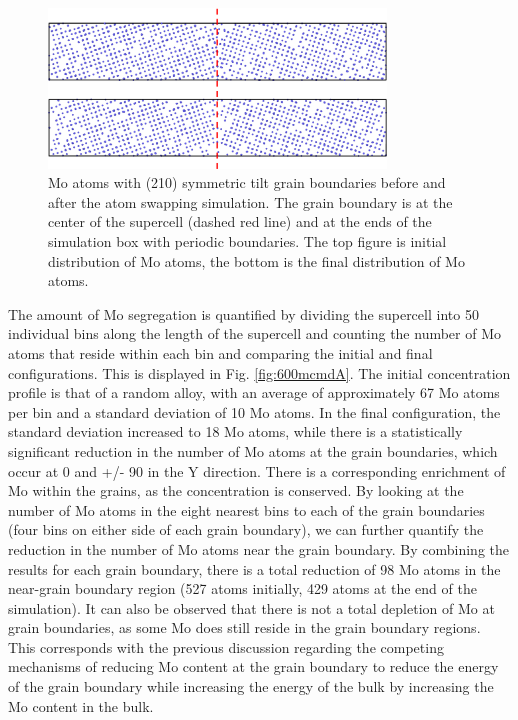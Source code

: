 \documentclass[review]{elsarticle}
\begin{document}
\begin{figure}[h]
 \centering
 \includegraphics[width=0.8\textwidth]{600mcmd.png} 
 \caption{Mo atoms with (210) symmetric tilt grain boundaries before and after the atom swapping simulation. The grain boundary is at the center of the supercell (dashed red line) and at the ends of the simulation box with periodic boundaries. The top figure is initial distribution of Mo atoms, the bottom is the final distribution of Mo atoms.}
 \label{fig:600mcmd}
\end{figure}

\FloatBarrier

The amount of Mo segregation is quantified by dividing the supercell into 50 individual bins along the length of the supercell and counting the number of Mo atoms that reside within each bin and comparing the initial and final configurations. This is displayed in Fig. \ref{fig:600mcmdA}. The initial concentration profile is that of a random alloy, with an average of approximately 67 Mo atoms per bin and a standard deviation of 10 Mo atoms. In the final configuration, the standard deviation increased to 18 Mo atoms, while there is a statistically significant reduction in the number of Mo atoms at the grain boundaries, which occur at 0 and +/- 90 in the Y direction. There is a corresponding enrichment of Mo within the grains, as the concentration is conserved. By looking at the number of Mo atoms in the eight nearest bins to each of the grain boundaries (four bins on either side of each grain boundary), we can further quantify the reduction in the number of Mo atoms near the grain boundary. By combining the results for each grain boundary, there is a total reduction of 98 Mo atoms in the near-grain boundary region (527 atoms initially, 429 atoms at the end of the simulation). It can also be observed that there is not a total depletion of Mo at grain boundaries, as some Mo does still reside in the grain boundary regions. This corresponds with the previous discussion regarding the competing mechanisms of reducing Mo content at the grain boundary to reduce the energy of the grain boundary while increasing the energy of the bulk by increasing the Mo content in the bulk.
\end{document}
